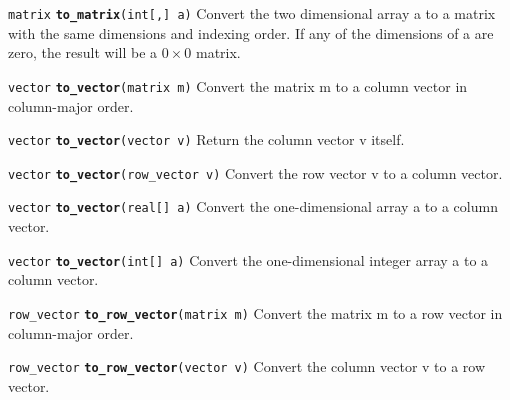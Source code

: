 \documentclass[
  10pt,
]{book}
\begin{document}
\texttt{matrix} \textbf{\texttt{to\_matrix}}\texttt{(int{[},{]}\ a)}\newline
Convert the two dimensional array a to a matrix with the same
dimensions and indexing order. If any of the dimensions of a are zero,
the result will be a \(0 \times 0\) matrix.


\texttt{vector} \textbf{\texttt{to\_vector}}\texttt{(matrix\ m)}\newline
Convert the matrix m to a column vector in column-major order.


\texttt{vector} \textbf{\texttt{to\_vector}}\texttt{(vector\ v)}\newline
Return the column vector v itself.


\texttt{vector} \textbf{\texttt{to\_vector}}\texttt{(row\_vector\ v)}\newline
Convert the row vector v to a column vector.


\texttt{vector} \textbf{\texttt{to\_vector}}\texttt{(real{[}{]}\ a)}\newline
Convert the one-dimensional array a to a column vector.


\texttt{vector} \textbf{\texttt{to\_vector}}\texttt{(int{[}{]}\ a)}\newline
Convert the one-dimensional integer array a to a column vector.


\texttt{row\_vector} \textbf{\texttt{to\_row\_vector}}\texttt{(matrix\ m)}\newline
Convert the matrix m to a row vector in column-major order.


\texttt{row\_vector} \textbf{\texttt{to\_row\_vector}}\texttt{(vector\ v)}\newline
Convert the column vector v to a row vector.
\end{document}
